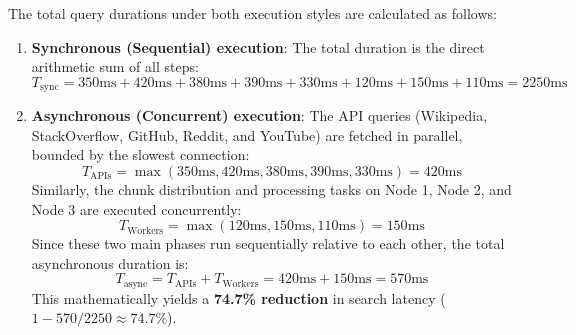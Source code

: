 \documentclass[11pt,a4paper]{article}
\begin{document}
The total query durations under both execution styles are calculated as follows:
\begin{enumerate}
    \item \textbf{Synchronous (Sequential) execution}: The total duration is the direct arithmetic sum of all steps:
    \begin{equation}
    T_{\text{sync}} = 350\text{ms} + 420\text{ms} + 380\text{ms} + 390\text{ms} + 330\text{ms} + 120\text{ms} + 150\text{ms} + 110\text{ms} = 2250\text{ms}
    \end{equation}
    
    \item \textbf{Asynchronous (Concurrent) execution}: The API queries (Wikipedia, StackOverflow, GitHub, Reddit, and YouTube) are fetched in parallel, bounded by the slowest connection:
    \begin{equation}
    T_{\text{APIs}} = \max(350\text{ms}, 420\text{ms}, 380\text{ms}, 390\text{ms}, 330\text{ms}) = 420\text{ms}
    \end{equation}
    Similarly, the chunk distribution and processing tasks on Node 1, Node 2, and Node 3 are executed concurrently:
    \begin{equation}
    T_{\text{Workers}} = \max(120\text{ms}, 150\text{ms}, 110\text{ms}) = 150\text{ms}
    \end{equation}
    Since these two main phases run sequentially relative to each other, the total asynchronous duration is:
    \begin{equation}
    T_{\text{async}} = T_{\text{APIs}} + T_{\text{Workers}} = 420\text{ms} + 150\text{ms} = 570\text{ms}
    \end{equation}
    This mathematically yields a \textbf{74.7\% reduction} in search latency ($1 - 570/2250 \approx 74.7\%$).
\end{enumerate}
\end{document}
